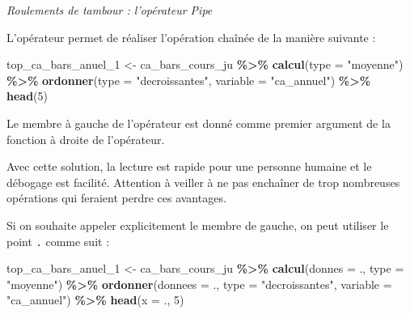 \documentclass[
  11pt,
]{book}
\newenvironment{Shaded}{\begin{snugshade}}{\end{snugshade}}
\newcommand{\DataTypeTok}[1]{\textcolor[rgb]{0.13,0.29,0.53}{#1}}
\newcommand{\DecValTok}[1]{\textcolor[rgb]{0.00,0.00,0.81}{#1}}
\newcommand{\KeywordTok}[1]{\textcolor[rgb]{0.13,0.29,0.53}{\textbf{#1}}}
\newcommand{\NormalTok}[1]{#1}
\newcommand{\OperatorTok}[1]{\textcolor[rgb]{0.81,0.36,0.00}{\textbf{#1}}}
\newcommand{\StringTok}[1]{\textcolor[rgb]{0.31,0.60,0.02}{#1}}
\numberwithin{equation}{section}
\numberwithin{countremarque}{section}
\begin{document}
\emph{Roulements de tambour : l'opérateur Pipe}

L'opérateur permet de réaliser l'opération chaînée de la manière suivante :

\begin{Shaded}
\begin{Highlighting}[]
\NormalTok{top\_ca\_bars\_anuel\_}\DecValTok{1}\NormalTok{ \textless{}{-}}\StringTok{ }
\StringTok{  }\NormalTok{ca\_bars\_cours\_ju }\OperatorTok{\%\textgreater{}\%}\StringTok{ }
\StringTok{  }\KeywordTok{calcul}\NormalTok{(}\DataTypeTok{type =} \StringTok{"moyenne"}\NormalTok{) }\OperatorTok{\%\textgreater{}\%}\StringTok{ }
\StringTok{  }\KeywordTok{ordonner}\NormalTok{(}\DataTypeTok{type =} \StringTok{"decroissantes"}\NormalTok{, }\DataTypeTok{variable =} \StringTok{"ca\_annuel"}\NormalTok{) }\OperatorTok{\%\textgreater{}\%}\StringTok{ }
\StringTok{  }\KeywordTok{head}\NormalTok{(}\DecValTok{5}\NormalTok{)}
\end{Highlighting}
\end{Shaded}

Le membre à gauche de l'opérateur est donné comme premier argument de la fonction à droite de l'opérateur.

Avec cette solution, la lecture est rapide pour une personne humaine et le débogage est facilité. Attention à veiller à ne pas enchaîner de trop nombreuses opérations qui feraient perdre ces avantages.

Si on souhaite appeler explicitement le membre de gauche, on peut utiliser le point \texttt{.} comme suit :

\begin{Shaded}
\begin{Highlighting}[]
\NormalTok{top\_ca\_bars\_anuel\_}\DecValTok{1}\NormalTok{ \textless{}{-}}\StringTok{ }
\StringTok{  }\NormalTok{ca\_bars\_cours\_ju }\OperatorTok{\%\textgreater{}\%}\StringTok{ }
\StringTok{  }\KeywordTok{calcul}\NormalTok{(}\DataTypeTok{donnes =}\NormalTok{ ., }\DataTypeTok{type =} \StringTok{"moyenne"}\NormalTok{) }\OperatorTok{\%\textgreater{}\%}\StringTok{ }
\StringTok{  }\KeywordTok{ordonner}\NormalTok{(}\DataTypeTok{donnees =}\NormalTok{ ., }\DataTypeTok{type =} \StringTok{"decroissantes"}\NormalTok{, }\DataTypeTok{variable =} \StringTok{"ca\_annuel"}\NormalTok{) }\OperatorTok{\%\textgreater{}\%}\StringTok{ }
\StringTok{  }\KeywordTok{head}\NormalTok{(}\DataTypeTok{x =}\NormalTok{ ., }\DecValTok{5}\NormalTok{)}
\end{Highlighting}
\end{Shaded}
\end{document}
